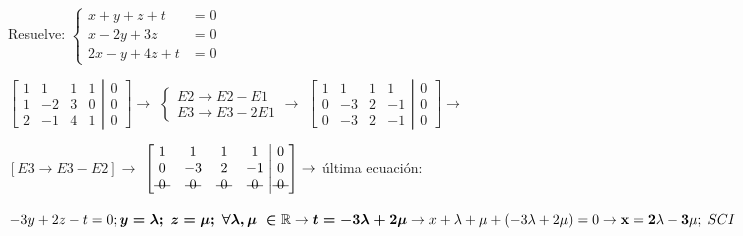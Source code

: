 \begin{ejre} 
Resuelve: $\begin{cases} x+y+z+t&=0\\x-2y+3z&=0\\2x-y+4z+t&=0 \end{cases}$
\end{ejre}
\begin{proofw}\renewcommand{\qedsymbol}{$\diamond$}
$\left[ \begin{matrix}
  1 & 1 & 1 & 1 \\ 1 & -2 & 3 & 0\\ 2 & -1 & 4 & 1 
 \end{matrix}\right. 
 \left| \begin{matrix}
  0 \\ 0 \\ 0 
 \end{matrix}\right] \to$
 \textcolor{gris}{$\begin{cases} E2\to E2-E1\\E3\to E3-2E1 \end{cases} \to  $}
$\left[ \begin{matrix}
  1 & 1 & 1 & 1 \\ 0 & -3 & 2 & -1\\ 0 & -3 & 2 & -1 
 \end{matrix}\right. 
 \left| \begin{matrix}
  0 \\ 0 \\ 0 
 \end{matrix}\right] \to$
 	
\noindent \textcolor{gris}{$[E3 \to E3-E2] \to $}
$\left[ \begin{matrix}
  1 & 1 & 1 & 1 \\ 0 & -3 & 2 & -1\\ \text{\textst{ 0 }} & \text{\textst{ 0 }} & \text{\textst{ 0 }} & \text{\textst{ 0 }} 
 \end{matrix}\right. 
 \left| \begin{matrix}
  0 \\ 0 \\ \text{\textst{ 0 }} 
 \end{matrix}\right] \to$ última ecuación:
 
 \noindent $-3y+2z-t=0; \boldsymbol{y=\lambda ;\;  z=\mu; \; \forall \lambda, \mu \; \in \mathbb R}\to \boldsymbol{t=-3\lambda+2\mu} \to x+\lambda+\mu+(-3\lambda+2\mu)=0 \to \bold{x=2\lambda-3\mu}; \; SCI$

\end{proofw}


